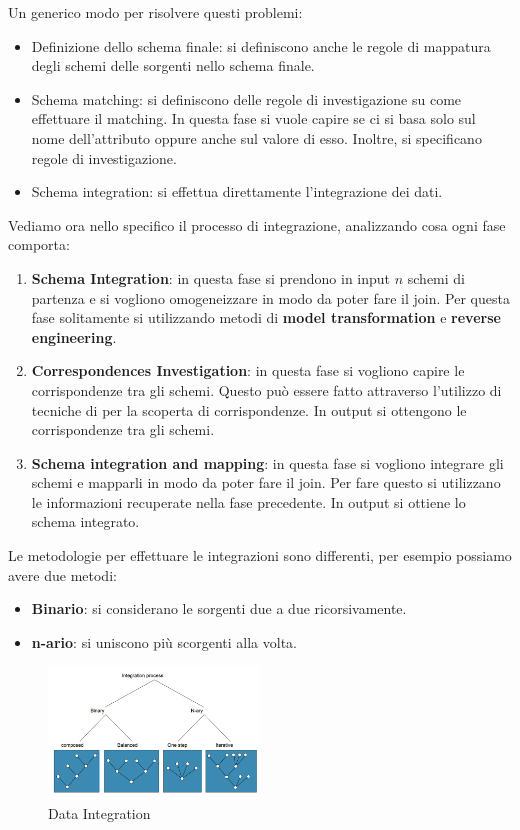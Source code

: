 Un generico modo per risolvere questi problemi:
\begin{itemize}
      \item Definizione dello schema finale: si definiscono anche le regole di
            mappatura degli schemi delle sorgenti nello schema finale.
      \item Schema matching: si definiscono delle regole di investigazione su come
            effettuare il matching. In questa fase si vuole capire se ci si basa
            solo sul nome dell'attributo oppure anche sul valore di esso. Inoltre,
            si specificano regole di investigazione.
      \item Schema integration: si effettua direttamente l'integrazione dei dati.
\end{itemize}
Vediamo ora nello specifico il processo di integrazione, analizzando cosa ogni
fase comporta:
\begin{enumerate}
      \item \textbf{Schema Integration}: in questa fase si prendono in input $n$
            schemi di partenza e si vogliono omogeneizzare in modo da poter fare
            il join. Per questa fase solitamente si utilizzando metodi di \textbf{
                  model transformation} e \textbf{reverse engineering}.
      \item \textbf{Correspondences Investigation}: in questa fase si vogliono
            capire le corrispondenze tra gli schemi. Questo può essere fatto
            attraverso l'utilizzo di tecniche di per la scoperta di corrispondenze.
            In output si ottengono le corrispondenze tra gli schemi.
      \item \textbf{Schema integration and mapping}: in questa fase si vogliono
            integrare gli schemi e mapparli in modo da poter fare il join. Per
            fare questo si utilizzano le informazioni recuperate nella fase
            precedente. In output si ottiene lo schema integrato.
\end{enumerate}
Le metodologie per effettuare le integrazioni sono differenti, per esempio possiamo
avere due metodi:
\begin{itemize}
      \item \textbf{Binario}: si considerano le sorgenti due a due ricorsivamente.
      \item \textbf{n-ario}: si uniscono più scorgenti alla volta.
\end{itemize}

\begin{figure}[!ht]
      \centering
      \includegraphics[width=0.5\textwidth]{./img/MLops/data_integration.png}
      \caption{Data Integration}
      \label{fig:data_integration}
\end{figure}

